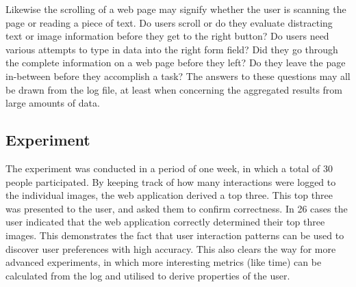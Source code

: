 Likewise the scrolling of a web page may signify whether the user is scanning the page or reading a piece of text. Do users scroll or do they evaluate distracting text or image information before they get to the right button? Do users need various attempts to type in data into the right form field?
Did they go through the complete information on a web page before they left? Do they leave the page in-between before they accomplish a task? The answers to these questions may all be drawn from the log file, at least when concerning the aggregated results from large amounts of data.

\subsection{Experiment}
The experiment was conducted in a period of one week, in which a total of 30 people participated. By keeping track of how many interactions were logged to the individual images, the web application derived a top three. This top three was presented to the user, and asked them to confirm correctness. In 26 cases the user indicated that the web application correctly determined their top three images. This demonstrates the fact that user interaction patterns can be used to discover user preferences with high accuracy. This also clears the way for more advanced experiments, in which more interesting metrics (like time) can be calculated from the log and utilised to derive properties of the user. 